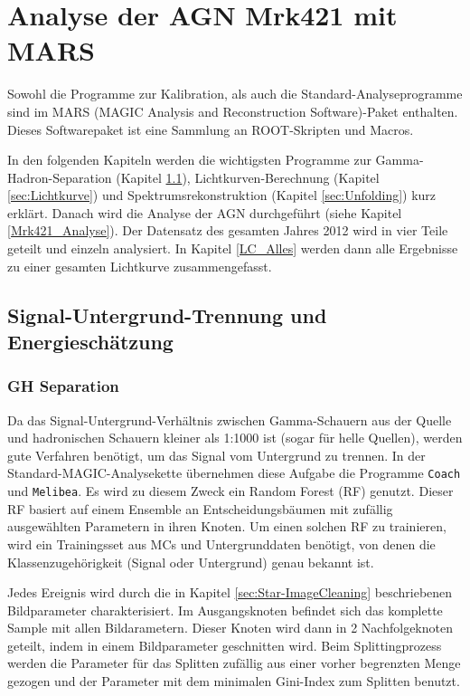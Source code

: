 \chapter{Analyse der AGN Mrk421 mit MARS}
Sowohl die Programme zur Kalibration, als auch die Standard-Analyseprogramme sind im MARS (MAGIC Analysis and Reconstruction Software)-Paket enthalten.
Dieses Softwarepaket ist eine Sammlung an ROOT-Skripten und Macros.\cite{MARS}

In den folgenden Kapiteln werden die wichtigsten Programme zur Gamma-Hadron-Separation (Kapitel \ref{sec:GH-Separation}), Lichtkurven-Berechnung (Kapitel \ref{sec:Lichtkurve}) und Spektrumsrekonstruktion (Kapitel \ref{sec:Unfolding}) kurz erklärt.
Danach wird die Analyse der AGN durchgeführt (siehe Kapitel \ref{Mrk421_Analyse}).
Der Datensatz des gesamten Jahres 2012 wird in vier Teile geteilt und einzeln analysiert. 
In Kapitel \ref{LC_Alles} werden dann alle Ergebnisse zu einer gesamten Lichtkurve zusammengefasst.


\section{Signal-Untergrund-Trennung und Energieschätzung}
\label{sec:GH-Separation}
\subsection{GH Separation}
Da das Signal-Untergrund-Verhältnis zwischen Gamma-Schauern aus der Quelle und hadronischen Schauern kleiner als 1:1000 ist (sogar für helle Quellen), werden gute Verfahren benötigt, um das Signal vom Untergrund zu trennen.
In der Standard-MAGIC-Analysekette übernehmen diese Aufgabe die Programme \texttt{Coach} und \texttt{Melibea}. 
Es wird zu diesem Zweck ein Random Forest (RF) genutzt. \cite{RandomForestForMAGIC}
Dieser RF basiert auf einem Ensemble an Entscheidungsbäumen mit zufällig ausgewählten Parametern in ihren Knoten.
Um einen solchen RF zu trainieren, wird ein Trainingsset aus MCs und Untergrunddaten benötigt, von denen die Klassenzugehörigkeit (Signal oder Untergrund) genau bekannt ist.

Jedes Ereignis wird durch die in Kapitel \ref{sec:Star-ImageCleaning} beschriebenen Bildparameter charakterisiert.
Im Ausgangsknoten befindet sich das komplette Sample mit allen Bildarametern.
Dieser Knoten wird dann in 2 Nachfolgeknoten geteilt, indem in einem Bildparameter geschnitten wird.
Beim Splittingprozess werden die  Parameter für das Splitten zufällig aus einer vorher begrenzten Menge gezogen und der Parameter mit dem minimalen Gini-Index zum Splitten benutzt.

